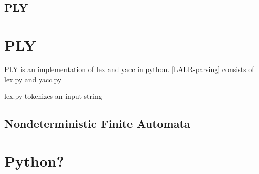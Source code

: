 \subsection{PLY}\label{sec:BackgroundPLY}

\section{PLY}\label{sec:BackgroundPLY}

\acf{PLY} \cite{PLY} is an implementation of lex and yacc in python.
[LALR-parsing]
consists of lex.py and yacc.py

lex.py tokenizes an input string


\subsection{Nondeterministic Finite Automata}\label{sec:BackgroundNDAutomata}

\section{Python?}\label{sec:BackgroundPython}